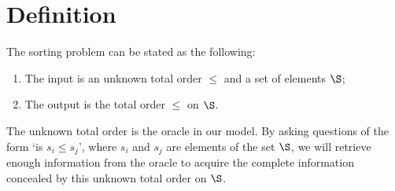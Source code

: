 \section{Definition}
\label{tree:sorting:def}

The sorting problem can be stated as the following:

\begin{enumerate}
\item The input is an unknown total order $\le$ and a set of elements $\S$;
\item The output is the total order $\le$ on $\S$.
\end{enumerate}

The unknown total order is the oracle in our model. By asking questions of the
form `is $s_i \le s_j$', where $s_i$ and $s_j$ are elements of the set $\S$,
we will retrieve enough information from the oracle to acquire the complete
information concealed by this unknown total order on $\S$.

